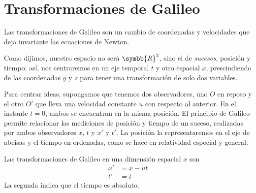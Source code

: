 \section{Transformaciones de Galileo}
Las transformaciones de Galileo son un cambio de coordenadas y velocidades que deja
invariante las ecuaciones de Newton.

Como dijimos, nuestro espacio no será $\symbb{R}^2$, sino el de \emph{sucesos}, posición
y tiempo; así, nos centraremos en un eje temporal $t$ y otro espacial $x$, prescindiendo
de las coordenadas $y$ y $z$ para tener una transformación de solo dos variables.

Para centrar ideas, supongamos que tenemos dos observadores, uno $O$ en reposo y el otro
$O'$ que lleva una velocidad constante $u$ con respecto al anterior. En el instante
$t=0$, ambos se encuentran en la misma posición.
El principio de Galileo permite relacionar las mediciones de posición y tiempo de un
suceso, realizadas por ambos observadores $x$, $t$ y $x'$ y $t'$. La posición la
representaremos en el eje de abcisas y el tiempo en ordenadas, como se hace en
relatividad especial y general.

Las transformaciones de Galileo en una dimensión espacial $x$ son
\begin{subequations}
  \begin{align}
    \label{eq:R2-transf_Galileo_x}
    x' &= x - ut\\  
    \label{eq:R2-transf_Galileo_t}
    t' &= t
\end{align}
\end{subequations}
La segunda indica que el tiempo es absoluto.

